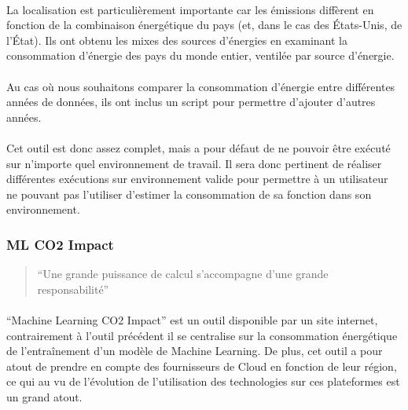 \documentclass[10pt, french, a4paper]{report}
\begin{document}
\paragraph{}
La localisation est particulièrement importante car les émissions diffèrent en fonction de la combinaison énergétique du pays (et, dans le cas des États-Unis, de l'État). Ils ont obtenu les mixes des sources d'énergies en examinant la consommation d'énergie des pays du monde entier, ventilée par source d'énergie.

\paragraph{}
Au cas où nous souhaitons comparer la consommation d'énergie entre différentes années de données, ils ont inclus un script pour permettre d'ajouter d'autres années.

\paragraph{}
Cet outil est donc assez complet, mais a pour défaut de ne pouvoir être exécuté sur n'importe quel environnement de travail. Il sera donc pertinent de réaliser différentes exécutions sur environnement valide pour permettre à un utilisateur ne pouvant pas l'utiliser d'estimer la consommation de sa fonction dans son environnement.

\subsubsection{ML CO2 Impact}

\begin{quotation}
  ``Une grande puissance de calcul s'accompagne d'une grande responsabilité''
\end{quotation}

\paragraph{}
``Machine Learning CO2 Impact'' est un outil disponible par un site internet, contrairement à l'outil précédent il se centralise sur la consommation énergétique de l'entraînement d'un modèle de Machine Learning. De plus, cet outil a pour atout de prendre en compte des fournisseurs de Cloud en fonction de leur région, ce qui au vu de l'évolution de l'utilisation des technologies sur ces plateformes est un grand atout.
\end{document}
